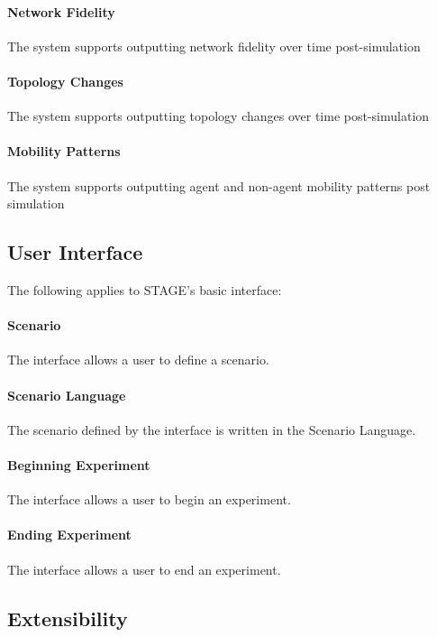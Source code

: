 \documentclass[titlepage]{article}
\begin{document}
    \paragraph{Network Fidelity} The system supports outputting network fidelity over time post-simulation
	\paragraph{Topology Changes} The system supports outputting topology changes over time post-simulation
	\paragraph{Mobility Patterns} The system supports outputting agent and non-agent mobility patterns post simulation


\subsection{User Interface%
  \label{user-interface}%
}

The following applies to STAGE's basic interface:
    \paragraph{Scenario} The interface allows a user to define a scenario.
    \paragraph{Scenario Language} The scenario defined by the interface is written in the Scenario Language.
    \paragraph{Beginning Experiment} The interface allows a user to begin an experiment.
    \paragraph{Ending Experiment} The interface allows a user to end an experiment.


\subsection{Extensibility%
  \label{extensibility}%
}
\end{document}
